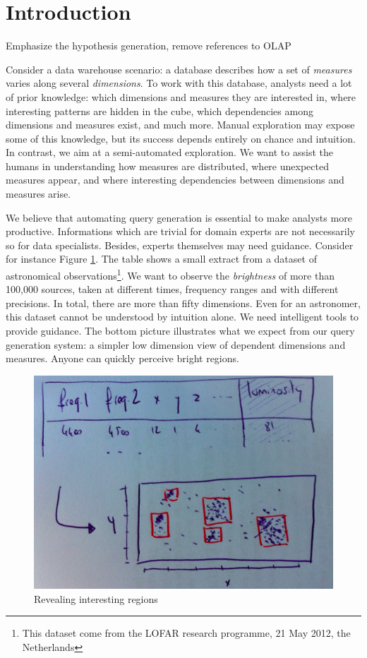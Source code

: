 \section{Introduction}
\label{sec:intro}

{ \color{red}
    Emphasize the hypothesis generation, remove references to OLAP}

Consider a data warehouse scenario: a database describes how a set of
\emph{measures} varies along several \emph{dimensions}. To work with this
database, analysts need a lot of prior knowledge: which dimensions and measures
they are interested in, where interesting patterns are hidden in the cube,
which dependencies among dimensions and measures exist, and much more.  Manual
exploration may expose some of this knowledge, but its success depends entirely
on chance and intuition. In contrast, we aim at a semi-automated exploration.
We want to assist the humans in understanding how measures are distributed,
where unexpected measures appear, and where interesting dependencies between
dimensions and measures arise.

We believe that automating query generation is essential to make analysts more
productive. Informations which are trivial for domain experts are not
necessarily so for data specialists. Besides, experts themselves may need
guidance. Consider for instance Figure \ref{intro}. The table shows a small
extract from a dataset of astronomical observations\footnote{This dataset come
from the LOFAR research programme, 21 May 2012, the Netherlands}. We want to
observe the \emph{brightness} of more than 100,000 sources, taken at different
times, frequency ranges and with different precisions. In total, there are more
than fifty dimensions. Even for an astronomer, this dataset cannot be
understood by intuition alone. We need intelligent tools to provide guidance.
The bottom picture illustrates what we expect from our query generation system:
a simpler low dimension view of dependent dimensions and measures.  Anyone can
quickly perceive bright regions.

\begin{figure}[t!]
\centering
\includegraphics[width=0.8\columnwidth]{images/intro}
\caption{Revealing interesting regions}
\label{intro}
\end{figure}

